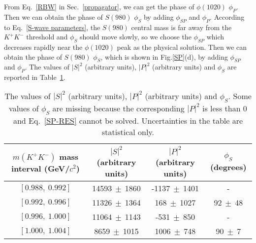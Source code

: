{    
    From Eq.~\ref{RBW} in Sec.~\ref{propagator}, we can get the phase of $\phi(1020)$ $\phi_{P}$.
    Then we can obtain the phase of $S(980)$ $\phi_{S}$ by adding $\phi_{SP}$ and $\phi_{P}$.
    According to Eq.~\ref{S-wave parameters}, the $S(980)$ central mass is far away from the $K^{+}K^{-}$ threshold and $\phi_{S}$ should move slowly, so we choose the $\phi_{SP}$ which decreases rapidly near the $\phi(1020)$ peak as the physical solution.
    Then we can obtain the phase of $S(980)$ $\phi_{S}$, which is shown in Fig.\ref{SP}(d), by adding $\phi_{SP}$ and $\phi_{P}$.
The values of $\left|S\right|^{2}$ (arbitrary units), $\left|P\right|^{2}$ (arbitrary units) and $\phi_{S}$ are reported in Table~\ref{SP-values}. 
    \begin{table}[htbp]
        \caption{
            The values of $\left|S\right|^{2}$ (arbitrary units), $\left|P\right|^{2}$ (arbitrary units) and $\phi_{S}$.
            Some values of $\phi_{S}$ are missing because the corresponding $\left|P\right|^{2}$ is less than 0 and Eq.~\ref{SP-RES} cannot be solved. 
            Uncertainties in the table are statistical only.
        }
        \label{SP-values}
        \begin{center}
            \begin{tabular}{cccc}
                \toprule\toprule
                $m(K^{+}K^{-})$ mass interval (GeV/$c^{2}$) & $\left|S\right|^{2}$ (arbitrary units) & $\left|P\right|^{2}$ (arbitrary units) & $\phi_{S}$ (degrees)\\
                \hline
                $[0.988,\ 0.992]$   &	14593$\ \pm\ $1860&	-1137$\ \pm\ $1401&	 - \\ 	
                $[0.992,\ 0.996]$   &	11326$\ \pm\ $1364&	168$\ \pm\ $1027&	92$\ \pm\ $48 \\ 	
                $[0.996,\ 1.000]$   &	11064$\ \pm\ $1143&	-531$\ \pm\ $850&	 - \\ 	
                $[1.000,\ 1.004]$   &	8659$\ \pm\ $1015&	1006$\ \pm\ $748&	90$\ \pm\ $7 \\ 	

\end{tabular}
\end{center}
\end{table}}
